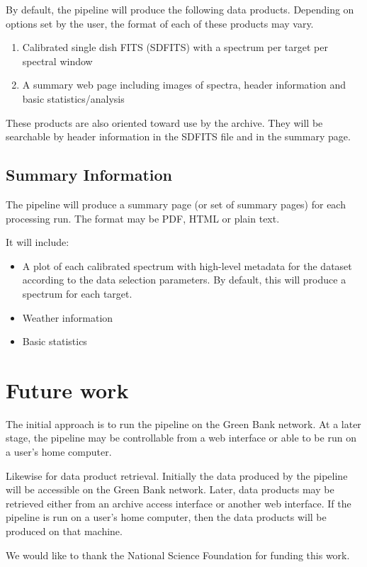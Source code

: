 By default, the pipeline will produce the following data products.  Depending on options set by the user, the format of each of these products may vary.
\begin{enumerate}
\item Calibrated single dish FITS (SDFITS) with a spectrum per target per spectral window
\item A summary web page including images of spectra, header information and basic statistics/analysis
\end{enumerate}

These products are also oriented toward use by the archive.  They will be searchable by header information in the SDFITS file and in the summary page.

\subsection{Summary Information}

The pipeline will produce a summary page (or set of summary pages) for each processing run.  The format may be PDF, HTML or plain text.

It will include:
\begin{itemize}
\item A plot of each calibrated spectrum with high-level metadata for the dataset according to the data selection parameters.  By default, this will produce a spectrum for each target.
\item Weather information
\item Basic statistics
\end{itemize}

\section{Future work}

The initial approach is to run the pipeline on the Green Bank network.  At a later stage, the pipeline may be controllable from a web interface or able to be run on a user's home computer.

Likewise for data product retrieval.  Initially the data produced by the pipeline will be accessible on the Green Bank network.  Later, data products may be retrieved either from an archive access interface or another web interface.  If the pipeline is run on a user's home computer, then the data products will be produced on that machine.

\acknowledgements We would like to thank the National Science Foundation for funding this work.


